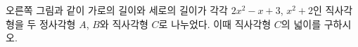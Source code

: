 \noindent\begin{minipage}[t]{0.58\linewidth}\vspace{0pt}\raggedright 오른쪽 그림과 같이 가로의 길이와 세로의 길이가 각각 $2x^2-x+3$, $x^2+2$인 직사각형을 두 정사각형 $A$, $B$와 직사각형 $C$로 나누었다. 이때 직사각형 $C$의 넓이를 구하시오.\end{minipage}\hfill\begin{minipage}[t]{0.4\linewidth}\vspace{0pt}\centering \resizebox{\ifdim\width>\linewidth\linewidth\else\width\fi}{!}{}\end{minipage}\par
